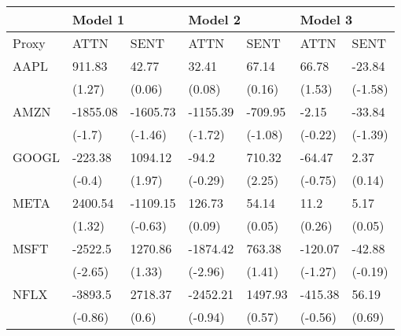 \begin{tabular}{lllllll}
\toprule
{} & \multicolumn{2}{l}{Model 1} & \multicolumn{2}{l}{Model 2} & \multicolumn{2}{l}{Model 3} \\
\midrule
Proxy &      ATTN &      SENT &      ATTN &     SENT &     ATTN &     SENT \\
AAPL  &    911.83 &     42.77 &     32.41 &    67.14 &    66.78 &   -23.84 \\
      &    (1.27) &    (0.06) &    (0.08) &   (0.16) &   (1.53) &  (-1.58) \\
AMZN  &  -1855.08 &  -1605.73 &  -1155.39 &  -709.95 &    -2.15 &   -33.84 \\
      &    (-1.7) &   (-1.46) &   (-1.72) &  (-1.08) &  (-0.22) &  (-1.39) \\
GOOGL &   -223.38 &   1094.12 &     -94.2 &   710.32 &   -64.47 &     2.37 \\
      &    (-0.4) &    (1.97) &   (-0.29) &   (2.25) &  (-0.75) &   (0.14) \\
META  &   2400.54 &  -1109.15 &    126.73 &    54.14 &     11.2 &     5.17 \\
      &    (1.32) &   (-0.63) &    (0.09) &   (0.05) &   (0.26) &   (0.05) \\
MSFT  &   -2522.5 &   1270.86 &  -1874.42 &   763.38 &  -120.07 &   -42.88 \\
      &   (-2.65) &    (1.33) &   (-2.96) &   (1.41) &  (-1.27) &  (-0.19) \\
NFLX  &   -3893.5 &   2718.37 &  -2452.21 &  1497.93 &  -415.38 &    56.19 \\
      &   (-0.86) &     (0.6) &   (-0.94) &   (0.57) &  (-0.56) &   (0.69) \\
\bottomrule
\end{tabular}

